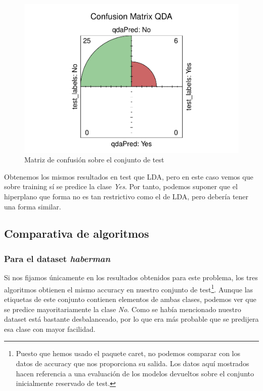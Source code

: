\begin{figure}[H]\center\includegraphics[width=\linewidth]{img/Clasificacion_files/figure-latex/unnamed-chunk-29-1}\caption{Matriz de confusión sobre el conjunto de test}\end{figure}

Obtenemos los mismos resultados en test que LDA, pero en este caso vemos que sobre training sí se predice la clase \textit{Yes}. Por tanto, podemos suponer que el hiperplano que forma no es tan restrictivo como el de LDA, pero debería tener una forma similar.

\newpage

\subsection{Comparativa de algoritmos}
\subsubsection{Para el dataset \textit{haberman}}

Si nos fijamos únicamente en los resultados obtenidos para este problema, los tres algoritmos obtienen el mismo accuracy en nuestro conjunto de test\footnote{Puesto que hemos usado el paquete caret, no podemos comparar con los datos de accuracy que nos proporciona su salida. Los datos aquí mostrados hacen referencia a una evaluación de los modelos devueltos sobre el conjunto inicialmente reservado de test.}. Aunque las etiquetas de este conjunto contienen elementos de ambas clases, podemos ver que se predice mayoritariamente la clase \textit{No}. Como se había mencionado nuestro dataset está bastante desbalanceado, por lo que era más probable que se predijera esa clase con mayor facilidad.

